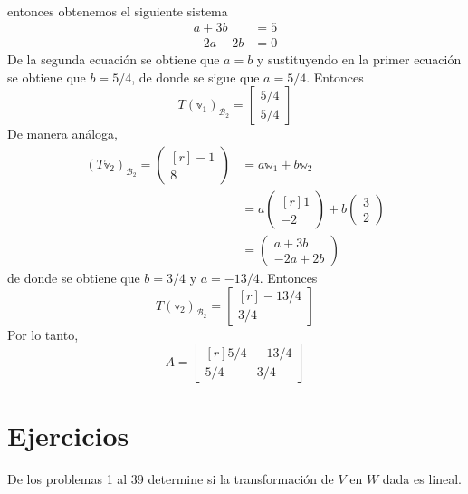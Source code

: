 \begin{example}
\begin{align*}
    \end{align*}
    entonces obtenemos el siguiente sistema
    \begin{align*}
        a + 3b & = 5 \\
        -2a + 2b & = 0
    \end{align*}
    De la segunda ecuación se obtiene que $a = b$ y sustituyendo en la primer ecuación se obtiene que $b = 5/4$, de donde se sigue que $a = 5/4$. Entonces
    $$T(\mathbb{v}_1)_{\mathcal{B}_2} = \begin{bmatrix} 5/4 \\ 5/4 \end{bmatrix}$$
    De manera análoga,
    \begin{align*}
        (T\mathbb{v}_2)_{\mathcal{B}_2} = \begin{pmatrix*}[r] -1 \\ 8 \end{pmatrix*} & = a\mathbb{w}_1 + b\mathbb{w}_2 \\
        & = a \begin{pmatrix*}[r] 1 \\ -2 \end{pmatrix*} + b\begin{pmatrix} 3 \\ 2 \end{pmatrix} \\
        & = \begin{pmatrix} a+3b \\ -2a+2b \end{pmatrix}
    \end{align*}
    de donde se obtiene que $b = 3/4$ y $a = -13/4$. Entonces
    $$T(\mathbb{v}_2)_{\mathcal{B}_2} = \begin{bmatrix*}[r] -13/4 \\ 3/4 \end{bmatrix*}$$
    Por lo tanto,
    $$A = \begin{bmatrix*}[r]
        5/4 & -13/4 \\
        5/4 & 3/4
    \end{bmatrix*}$$
\end{example}

\newpage

\section{Ejercicios}

\noindent
De los problemas 1 al 39 determine si la transformación de $V$ en $W$ dada es lineal.

